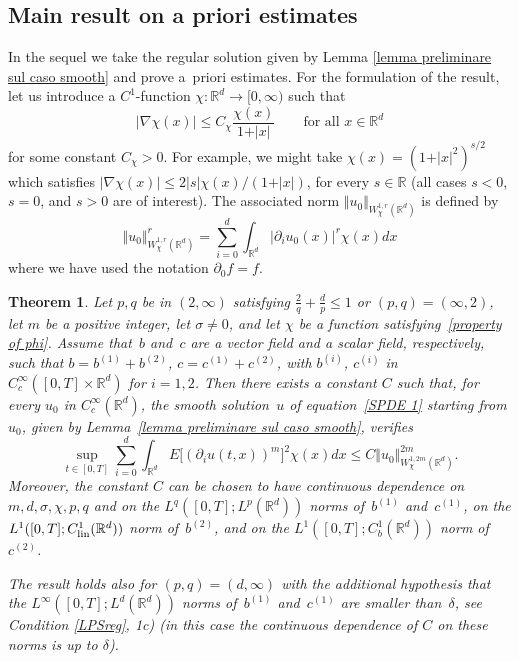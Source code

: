 \documentclass[a4paper,10pt]{article}
\newtheorem{theorem}{Theorem}[section]
\newcommand\1{\mathbbm{1}}
\newcommand\lin{{\rm lin}}
\numberwithin{equation}{section}
\begin{document}
\subsection{Main result on a priori estimates}

In the sequel we take the regular solution given by Lemma \ref{lemma preliminare sul caso smooth} and prove a~priori estimates. For the formulation of the result, let us introduce a $C^{1}$-function $\chi \colon \mathbb{R}^{d}\rightarrow [0,\infty)$ such that
\begin{equation}
\vert \nabla \chi (x) \vert \leq C_{\chi} \frac{\chi(x)}{1+\vert x\vert} \qquad \text{for all } x \in \mathbb{R}^{d}
\label{property of phi}
\end{equation}
for some constant $C_{\chi}>0$. For example, we might take $\chi(x)  =(1+\vert x\vert^{2})^{s/2}$ which satisfies $\vert \nabla\chi(x)\vert \leq 2 \vert s \vert \chi(x)/(1+\vert x \vert)$, for every $s\in\mathbb{R}$ (all cases $s<0$, $s=0$, and $s>0$ are of interest). The associated norm $\Vert u_{0}\Vert_{W_{\chi}^{1,r}(\mathbb{R}^{d})}$ is defined by
\begin{equation*}
\Vert u_{0} \Vert_{W_{\chi}^{1,r} (\mathbb{R}^{d})}^{r} = \sum_{i=0}^{d} \int_{\mathbb{R}^{d}} \vert \partial_{i}u_{0}(x) \vert^{r} \chi(x)  dx
\end{equation*}
where we have used the notation $\partial_{0}f=f$.

\begin{theorem}
\label{theorem a priori estimate} 
Let $p,q$ be in $(2,\infty)$ satisfying $\frac{2}{q}+\frac{d}{p}\leq1$ or $(p,q)=(\infty,2)$, let $m$ be a positive integer, let $\sigma \neq 0$, and let $\chi$ be a function satisfying~\eqref{property of phi}. Assume that~$b$ and~$c$ are a vector field and a scalar field, respectively, such that $b=b^{(1)}+b^{(2)}$, $c=c^{(1)}+c^{(2)}$, with $b^{(i)}$, $c^{(i)}$ in $C_{c}^{\infty}([0,T]\times \mathbb{R}^{d})$ for $i=1,2$. Then there exists a constant $C$ such that, for every $u_{0}$ in $C_{c}^{\infty}(\mathbb{R}^{d})$, the smooth solution~$u$ of equation~\eqref{SPDE 1} starting from $u_{0}$, given by Lemma~\ref{lemma preliminare sul caso smooth}, verifies
\begin{equation*}
\sup_{t\in [0,T]}\sum_{i=0}^{d} \int_{\mathbb{R}^{d}} E\big[ (\partial_{i}u(t,x))^{m} \big]^{2} \chi(x) dx\leq C \Vert u_{0} \Vert_{W_{\chi}^{1,2m}(\mathbb{R}^{d}) }^{2m}.
\end{equation*}
Moreover, the constant $C$ can be chosen to have continuous dependence on $m,d,\sigma,\chi,p,q$ and on the $L^{q}([0,T];L^{p}(\mathbb{R}^{d}))$ norms of~$b^{(1)}$ and~$c^{(1)}$, on the $L^{1}([0,T];C_{\lin}^{1}(\mathbb{R}^{d}))$ norm of~$b^{(2)}$, and on the $L^{1}([0,T];C_{b}^{1}(\mathbb{R}^{d}))$ norm of~$c^{(2)}$.

The result holds also for $(p,q)=(d,\infty)$ with the additional hypothesis that the $L^{\infty}([0,T];L^{d}(\mathbb{R}^{d}))$ norms of~$b^{(1)}$ and~$c^{(1)}$ are smaller than~$\delta$, see Condition \ref{LPSreg}, \textup{1c)} \textup{(}in this case the continuous dependence of $C$ on these norms is up to $\delta$\textup{)}.
\end{theorem}
\end{document}
